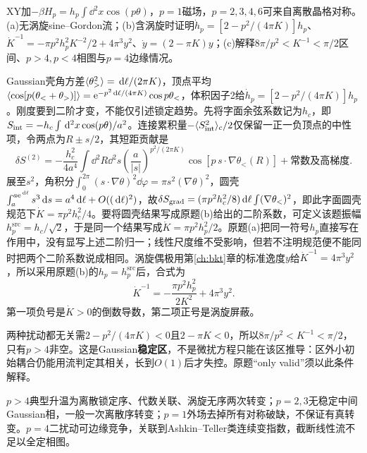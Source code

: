 \begin{exercise}[原题3(a)--(c)，选做]\label{p:334-6-3}
XY加$-\beta H_p=h_p\int\dd^2x\cos(p\theta)$，$p=1$磁场，$p=2,3,4,6$可来自离散晶格对称。(a)无涡旋sine--Gordon流；(b)含涡旋时证明$\dot h_p=[2-p^2/(4\pi K)]h_p$、$\dot K^{-1}=-\pi p^2h_p^2K^{-2}/2+4\pi^3y^2$、$\dot y=(2-\pi K)y$；(c)解释$8\pi/p^2<K^{-1}<\pi/2$区间、$p>4,p<4$相图与$p=4$边缘情况。
\end{exercise}
\begin{solution}
Gaussian壳角方差$\langle \theta_>^2\rangle=\,\mathrm d\ell/(2\pi K)$，顶点平均$\langle \cos[p(\theta_<+\theta_>)]\rangle=\mathrm e^{-p^2\,\mathrm d\ell/(4\pi K)}\cos p\theta_<$，体积因子2给$\dot h_p=[2-p^2/(4\pi K)]h_p$。刚度要到二阶才变，不能仅引述锁定趋势。先将字面余弦系数记为$h_c$，即$S_{\rm int}=-h_c\int\,\mathrm d^2x\cos(p\theta)/a^2$。连接累积量$-\langle S_{\rm int}^2\rangle_c/2$仅保留一正一负顶点的中性项，令两点为$R\pm s/2$，其短距贡献是
\begin{equation}
\delta S^{(2)}=-\frac{h_c^2}{4a^4}\int\dd^2R\dd^2s
\left(\frac a{|s|}\right)^{p^2/(2\pi K)}
\cos[p\,s\cdot\nabla\theta_<(R)]+\text{常数及高梯度}.
\end{equation}
展至$s^2$，角积分$\int_0^{2\pi}(s\cdot\nabla\theta)^2\dd\varphi=\pi s^2(\nabla\theta)^2$，圆壳$\int_a^{a\mathrm e^{\,\mathrm d\ell}}s^3\,\mathrm d s=a^4\,\mathrm d\ell+O((\,\mathrm d\ell)^2)$，故$\delta S_{\rm grad}=(\pi p^2h_c^2/8)\,\mathrm d\ell\int(\nabla\theta_<)^2$，即此字面圆壳规范下$\dot K=\pi p^2h_c^2/4$。要将圆壳结果写成原题(b)给出的二阶系数，可定义该题振幅$h_p^{\mathrm{src}}=h_c/\sqrt2$，于是同一个结果写成$\dot K=\pi p^2h_p^2/2$。原题(a)把同一符号$h_p$直接写在作用中，没有显写上述二阶归一；线性尺度维不受影响，但若不注明规范便不能同时把两个二阶系数说成相同。涡旋偶极用第\ref{ch:bkt}章的标准逸度$y$给$\dot K^{-1}=4\pi^3y^2$，所以采用原题(b)的$h_p=h_p^{\mathrm{src}}$后，合式为
\begin{equation}
\dot K^{-1}=-\frac{\pi p^2h_p^2}{2K^2}+4\pi^3y^2.
\end{equation}
第一项负号是$\dot K>0$的倒数导数，第二项正号是涡旋屏蔽。

两种扰动都无关需$2-p^2/(4\pi K)<0$且$2-\pi K<0$，所以$8\pi/p^2<K^{-1}<\pi/2$，只有$p>4$非空。这是Gaussian\textbf{稳定区}，不是微扰方程只能在该区推导：区外小初始耦合仍能用流判定其相关，长到$O(1)$后才失控。原题“only valid”须以此条件解释。

$p>4$典型升温为离散锁定序、代数关联、涡旋无序两次转变；$p=2,3$无稳定中间Gaussian相，一般一次离散序转变；$p=1$外场去掉所有对称破缺，不保证有真转变。$p=4$二扰动可边缘竞争，关联到Ashkin--Teller类连续变指数，截断线性流不足以全定相图。
\begin{center}\end{center}
\end{solution}
